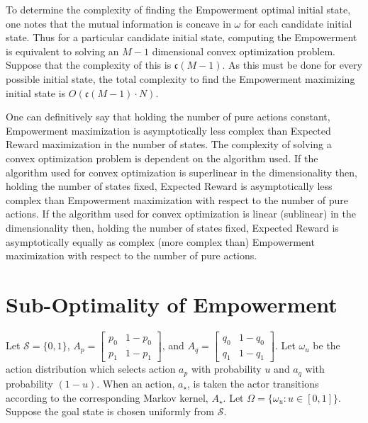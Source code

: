 \documentclass{article}
\newcommand{\Ss}{\mathcal{S}}
\begin{document}
To determine the complexity of finding the Empowerment optimal initial state, one notes that the mutual information is concave \cite{braverman2011information} in $\omega$ for each candidate initial state. Thus for a particular candidate initial state, computing the Empowerment is equivalent to solving an $M-1$ dimensional convex optimization problem. Suppose that the complexity of this is $\mathfrak{c}(M-1)$. As this must be done for every possible initial state, the total complexity to find the Empowerment maximizing initial state is $O(\mathfrak{c}(M-1)\cdot N)$. 

One can definitively say that holding the number of pure actions constant, Empowerment maximization is asymptotically less complex than Expected Reward maximization in the number of states. The complexity of solving a convex optimization problem is dependent on the algorithm used. If the algorithm used for convex optimization is superlinear in the dimensionality then, holding the number of states fixed, Expected Reward is asymptotically less complex than Empowerment maximization with respect to the number of pure actions. If the algorithm used for convex optimization is linear (sublinear) in the dimensionality then, holding the number of states fixed, Expected Reward is asymptotically equally as complex (more complex than) Empowerment maximization with respect to the number of pure actions.
\section{Sub-Optimality of Empowerment}
Let $\Ss=\{0,1\}$, $A_p=\left[\begin{matrix} p_0 & 1-p_0 \\ p_1 & 1-p_1\end{matrix}\right]$, and $A_q=\left[\begin{matrix} q_0 & 1-q_0 \\ q_1 & 1-q_1\end{matrix}\right]$. Let $\omega_u$ be the action distribution which selects action $a_p$ with probability $u$ and $a_q$ with probability $(1-u)$. When an action, $a_\star$, is taken the actor transitions according to the corresponding Markov kernel, $A_\star$. Let $\Omega=\{\omega_u:u\in[0,1]\}$. Suppose the goal state is chosen uniformly from $\Ss$.
\end{document}
